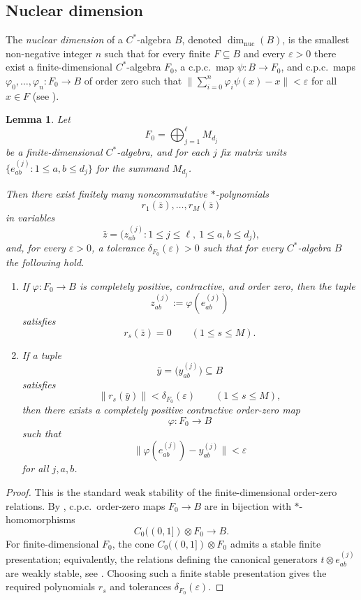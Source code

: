 \documentclass[12pt,fleqn,a4paper]{amsart}
\renewcommand{\le}{\leqslant}
\numberwithin{equation}{section}
\newtheorem{lemma}[theorem]{Lemma}
\theoremstyle{definition}
\begin{document}
\subsection{Nuclear dimension}

The \emph{nuclear dimension} of a $C^*$-algebra $B$, denoted
$\dim_{\mathrm{nuc}}(B)$, is the smallest non-negative integer $n$ such that for
every finite $F\subseteq B$ and every $\varepsilon>0$ there exist a
finite-dimensional $C^*$-algebra $F_0$, a c.p.c.\ map $\psi:B\to F_0$, and c.p.c.\
maps $\varphi_0,\dots,\varphi_n:F_0\to B$ of order zero such that
$\|\sum_{i=0}^n\varphi_i\psi(x)-x\|<\varepsilon$ for all $x\in F$
(see \cite{WinterZacharias}).

\begin{lemma}
\label{lem:order-zero-coding}
Let
\[
F_0=\bigoplus_{j=1}^{\ell} M_{d_j}
\]
be a finite-dimensional $C^*$-algebra, and for each $j$ fix matrix units
$\{e_{ab}^{(j)}:1\le a,b\le d_j\}$ for the summand $M_{d_j}$.

Then there exist finitely many noncommutative $*$-polynomials
\[
r_1(\bar z),\dots,r_M(\bar z)
\]
in variables
\[
\bar z=\bigl(z_{ab}^{(j)}:1\le j\le \ell,\ 1\le a,b\le d_j\bigr),
\]
and, for every $\varepsilon>0$, a tolerance $\delta_{F_0}(\varepsilon)>0$ such that for
every $C^*$-algebra $B$ the following hold.

\begin{enumerate}
\item If $\varphi:F_0\to B$ is completely positive, contractive, and order zero, then the
tuple
\[
z_{ab}^{(j)}:=\varphi(e_{ab}^{(j)})
\]
satisfies
\[
r_s(\bar z)=0\qquad (1\le s\le M).
\]

\item If a tuple
\[
\bar y=\bigl(y_{ab}^{(j)}\bigr)\subseteq B
\]
satisfies
\[
\|r_s(\bar y)\|<\delta_{F_0}(\varepsilon)\qquad (1\le s\le M),
\]
then there exists a completely positive contractive order-zero map
\[
\varphi:F_0\to B
\]
such that
\[
\|\varphi(e_{ab}^{(j)})-y_{ab}^{(j)}\|<\varepsilon
\]
for all $j,a,b$.
\end{enumerate}
\end{lemma}

\begin{proof}
This is the standard weak stability of the finite-dimensional order-zero relations.
By \cite[Theorem~2.3]{WinterZacharias}, c.p.c.\ order-zero maps
$F_0\to B$ are in bijection with $*$-homomorphisms
\[
C_0((0,1])\otimes F_0 \longrightarrow B.
\]
For finite-dimensional $F_0$, the cone $C_0((0,1])\otimes F_0$ admits a stable finite
presentation; equivalently, the relations defining the canonical generators
$t\otimes e_{ab}^{(j)}$ are weakly stable, see
\cite[Proposition~1.4]{WinterZacharias}.  Choosing such a finite stable presentation
gives the required polynomials $r_s$ and tolerances $\delta_{F_0}(\varepsilon)$.
\end{proof}
\end{document}
